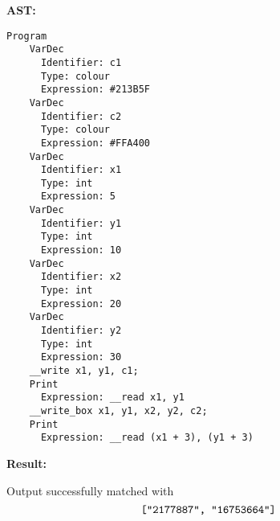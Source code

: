 \textbf{AST:}

{
  \lstset{xleftmargin=0.2\textwidth}

  \begin{lstlisting}
Program
    VarDec
      Identifier: c1
      Type: colour
      Expression: #213B5F
    VarDec
      Identifier: c2
      Type: colour
      Expression: #FFA400
    VarDec
      Identifier: x1
      Type: int
      Expression: 5
    VarDec
      Identifier: y1
      Type: int
      Expression: 10
    VarDec
      Identifier: x2
      Type: int
      Expression: 20
    VarDec
      Identifier: y2
      Type: int
      Expression: 30
    __write x1, y1, c1;
    Print
      Expression: __read x1, y1
    __write_box x1, y1, x2, y2, c2;
    Print
      Expression: __read (x1 + 3), (y1 + 3)
\end{lstlisting}

}

\textbf{Result:}

Output successfully matched with $$\texttt{["2177887", "16753664"]}$$

\newpage
